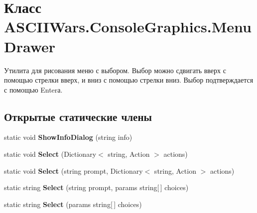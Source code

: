 \hypertarget{class_a_s_c_i_i_wars_1_1_console_graphics_1_1_menu_drawer}{}\section{Класс A\+S\+C\+I\+I\+Wars.\+Console\+Graphics.\+Menu\+Drawer}
\label{class_a_s_c_i_i_wars_1_1_console_graphics_1_1_menu_drawer}


Утилита для рисования меню с выбором. Выбор можно сдвигать вверх с помощью стрелки вверх, и вниз с помощью стрелки вниз. Выбор подтверждается с помощью Enter\textquotesingle{}а.  


\subsection*{Открытые статические члены}
\begin{DoxyCompactItemize}
\item 
\hypertarget{class_a_s_c_i_i_wars_1_1_console_graphics_1_1_menu_drawer_a48cc3b43302cba89239d72c3f6bcddab}{}\label{class_a_s_c_i_i_wars_1_1_console_graphics_1_1_menu_drawer_a48cc3b43302cba89239d72c3f6bcddab} 
static void {\bfseries Show\+Info\+Dialog} (string info)
\item 
\hypertarget{class_a_s_c_i_i_wars_1_1_console_graphics_1_1_menu_drawer_a2c8b1f60df7a915364bc4c0244599aa1}{}\label{class_a_s_c_i_i_wars_1_1_console_graphics_1_1_menu_drawer_a2c8b1f60df7a915364bc4c0244599aa1} 
static void {\bfseries Select} (Dictionary$<$ string, Action $>$ actions)
\item 
\hypertarget{class_a_s_c_i_i_wars_1_1_console_graphics_1_1_menu_drawer_a5870384104321c1a9e954514ebd11b3a}{}\label{class_a_s_c_i_i_wars_1_1_console_graphics_1_1_menu_drawer_a5870384104321c1a9e954514ebd11b3a} 
static void {\bfseries Select} (string prompt, Dictionary$<$ string, Action $>$ actions)
\item 
\hypertarget{class_a_s_c_i_i_wars_1_1_console_graphics_1_1_menu_drawer_a119f33600258dbcc040ca77f06d6c7ac}{}\label{class_a_s_c_i_i_wars_1_1_console_graphics_1_1_menu_drawer_a119f33600258dbcc040ca77f06d6c7ac} 
static string {\bfseries Select} (string prompt, params string\mbox{[}$\,$\mbox{]} choices)
\item 
\hypertarget{class_a_s_c_i_i_wars_1_1_console_graphics_1_1_menu_drawer_aab8b9a476227de6b8d81cb87747bdc99}{}\label{class_a_s_c_i_i_wars_1_1_console_graphics_1_1_menu_drawer_aab8b9a476227de6b8d81cb87747bdc99} 
static string {\bfseries Select} (params string\mbox{[}$\,$\mbox{]} choices)
\end{DoxyCompactItemize}


